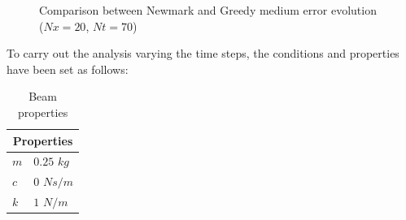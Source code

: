 \documentclass{ws-m3as}
\begin{document}
\begin{figure}
 \centering
  \caption{Comparison between Newmark and Greedy medium error evolution ($Nx=20$, $Nt=70$)}
 \label{MedErrorEvoSpace}
\end{figure}




To carry out the analysis varying the time steps, the conditions and properties have been set as follows:

\begin{table}[htb]
\centering
\caption{Beam properties}
\label{tabla:propiedadesTime}
\begin{tabular}{|l|l|}
\hline
\multicolumn{2}{|c|}{Properties} \\ \hline
$m$ & $0.25$ $kg$ \\
$c$ & $0$ $N s/m$\\
$k$ & $1$ $N/m$\\
\hline
\end{tabular}
\end{table}
\end{document}
